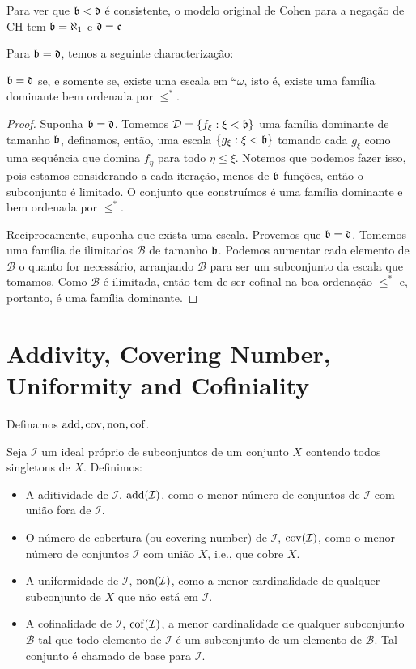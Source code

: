 Para ver que $\mathfrak{b} < \mathfrak{d}$ é consistente, o modelo original de Cohen para a negação de CH tem $\mathfrak{b} = \aleph_1$ e $\mathfrak{d} = \mathfrak{c}$

Para $\mathfrak{b} = \mathfrak{d}$, temos a seguinte characterização:

\begin{theorem}
    $\mathfrak{b} = \mathfrak{d}$ se, e somente se, existe uma escala em $^\omega\omega$, isto é, existe uma família dominante bem ordenada por $\leq^*$.  
\end{theorem}
\begin{proof}
    Suponha $\mathfrak{b} = \mathfrak{d}$. Tomemos $\mathcal D = \left\{ f_\xi:\xi < \mathfrak{b} \right\}$ uma família dominante de tamanho $\mathfrak{b}$, definamos, então, uma escala $\left\{ g_\xi:\xi<\mathfrak{b} \right\}$ tomando cada $g_\xi$ como uma sequência que domina $f_\eta$ para todo $\eta\leq \xi$. Notemos que podemos fazer isso, pois estamos considerando a cada iteração, menos de $\mathfrak{b}$ funções, então o subconjunto é limitado. O conjunto que construímos é uma família dominante e bem ordenada por $\leq^*$. 
    
    Reciprocamente, suponha que exista uma escala. Provemos que $\mathfrak{b} = \mathfrak{d}$. Tomemos uma família de ilimitados $\mathcal B$ de tamanho $\mathfrak{b}$. Podemos aumentar cada elemento de $\mathcal B$ o quanto for necessário, arranjando $\mathcal B$ para ser um subconjunto da escala que tomamos. Como $\mathcal B$ é ilimitada, então tem de ser cofinal na boa ordenação $\leq^*$ e, portanto, é uma família dominante.
\end{proof}

\section{Addivity, Covering Number, Uniformity and Cofiniality}

Definamos $\operatorname{add},\operatorname{cov}, \operatorname{non}, \operatorname{cof}$. 

\begin{definition}
    Seja $\mathcal I$ um ideal próprio de subconjuntos de um conjunto $X$ contendo todos singletons de $X$. Definimos:

    \begin{itemize}
        \item A aditividade de $\mathcal I$, $\operatorname{add}(\mathcal I)$, como o menor número de conjuntos de $\mathcal I$ com união fora de $\mathcal I$. 
        \item O número de cobertura (ou covering number) de $\mathcal I$, $\operatorname{cov}(\mathcal I)$, como o menor número de conjuntos $\mathcal I$ com união $X$, i.e., que cobre $X$. 
        \item A uniformidade de $\mathcal I$, $\operatorname{non}(\mathcal I)$, como a menor cardinalidade de qualquer subconjunto de $X$ que não está em $\mathcal I$. 
        \item A cofinalidade de $\mathcal I$, $\operatorname{cof}(\mathcal I)$, a menor cardinalidade de qualquer subconjunto $\mathcal B$ tal que todo elemento de $\mathcal I$ é um subconjunto de um elemento de $\mathcal B$. Tal conjunto é chamado de base para $\mathcal I$. 
    \end{itemize}
\end{definition}

